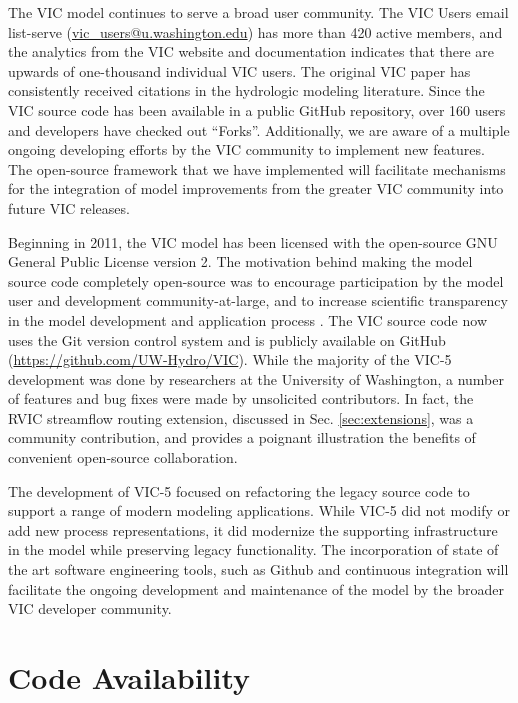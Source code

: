 \documentclass[gmd, manuscript]{copernicus}
\begin{document}
\conclusions[Conclusions]
\label{sec:conclusions}

  The VIC model continues to serve a broad user community. The VIC Users email list-serve (\url{vic_users@u.washington.edu}) has more than 420 active members, and the analytics from the VIC website and documentation indicates that there are upwards of one-thousand individual VIC users. The original VIC paper \citep{Liang_1994} has consistently received citations in the hydrologic modeling literature. Since the VIC source code has been available in a public GitHub repository, over 160 users and developers have checked out ``Forks''. Additionally, we are aware of a multiple ongoing developing efforts by the VIC community to implement new features. The open-source framework that we have implemented will facilitate mechanisms for the integration of model improvements from the greater VIC community into future VIC releases.

  Beginning in 2011, the VIC model has been licensed with the open-source GNU General Public License version 2. The motivation behind making the model source code completely open-source was to encourage participation by the model user and development community-at-large, and to increase scientific transparency in the model development and application process \citep{Ince_2012}. The VIC source code now uses the Git version control system \citep{Torvalds_2010} and is publicly available on GitHub (\url{https://github.com/UW-Hydro/VIC}). While the majority of the VIC-5 development was done by researchers at the University of Washington, a number of features and bug fixes were made by unsolicited contributors. In fact, the RVIC streamflow routing extension, discussed in Sec. \ref{sec:extensions}, was a community contribution, and provides a poignant illustration the benefits of convenient open-source collaboration.

  The development of VIC-5 focused on refactoring the legacy source code to support a range of modern modeling applications. While VIC-5 did not modify or add new process representations, it did modernize the supporting infrastructure in the model while preserving legacy functionality. The incorporation of state of the art software engineering tools, such as Github and continuous integration will facilitate the ongoing development and maintenance of the model by the broader VIC developer community.

\section{Code Availability}
\label{appendix:code_avail}
\end{document}
